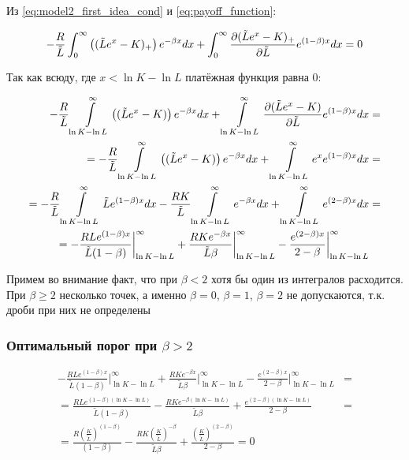 \documentclass[a4paper,12pt]{article}
\theoremstyle{definition}
\begin{document}
Из \eqref{eq:model2_first_idea_cond} и \eqref{eq:payoff_function}:

\begin{equation}\label{}
    - \frac{R}{\tilde{L}} \int_{0}^{\infty} \left((\tilde{L} e^{x} - K)_{+}\right) e^{-\beta x} dx + \int_{0}^{\infty} \pdv{(\tilde{L} e^{x} - K)_{+}}{\tilde{L}} e^{(1 - \beta) x} dx = 0
\end{equation}

Так как всюду, где $x < \ln K - \ln L$ платёжная функция равна $0$:

\begin{equation}
\begin{split}
    - \frac{R}{\tilde{L}} \int\limits_{\ln K - \ln L}^{\infty} \left((\tilde{L} e^{x} - K)\right) e^{-\beta x} dx + \int\limits_{\ln K - \ln L}^{\infty} \pdv{(\tilde{L} e^{x} - K)} {\tilde{L}} e^{(1 - \beta) x} dx &= \\
    = - \frac{R}{\tilde{L}} \int\limits_{\ln K - \ln L}^{\infty} \left((\tilde{L} e^{x} - K)\right) e^{-\beta x} dx + \int\limits_{\ln K - \ln L}^{\infty} e^{x} e^{(1 - \beta) x} dx &= \\
    = - \frac{R}{\tilde{L}} \int\limits_{\ln K - \ln L}^{\infty} \tilde{L} e^{(1 - \beta) x} dx - \frac{R K}{\tilde{L}} \int\limits_{\ln K - \ln L}^{\infty} e^{-\beta x} dx + \int\limits_{\ln K - \ln L}^{\infty} e^{(2 - \beta) x} dx &= \\
    = - \frac{R L e^{(1 - \beta) x}}{\tilde{L} (1 - \beta)}\bigg|_{\ln K - \ln L}^{\infty} + \frac{R K e^{-\beta x}}{\tilde{L} \beta}\bigg|_{\ln K - \ln L}^{\infty} - \frac{e^{(2 - \beta) x}}{2 - \beta}\bigg|_{\ln K - \ln L}^{\infty}
\end{split}
\end{equation}

Примем во внимание факт, что при $\beta < 2$ хотя бы один из интегралов расходится. При $\beta \ge 2$ несколько точек, а именно $\beta = 0$, $\beta = 1$, $\beta = 2$ не допускаются, т.к. дроби при них не определены

\subsubsection{Оптимальный порог при $\beta > 2$}

\begin{equation*}
\begin{split}
    - \frac{R L e^{(1 - \beta) x}}{\tilde{L} (1 - \beta)}\bigg|_{\ln K - \ln L}^{\infty} + \frac{R K e^{-\beta x}}{\tilde{L} \beta}\bigg|_{\ln K - \ln L}^{\infty} - \frac{e^{(2 - \beta) x}}{2 - \beta}\bigg|_{\ln K - \ln L}^{\infty} &= \\
    = \frac{R L e^{(1 - \beta) (\ln K - \ln L)}}{\tilde{L} (1 - \beta)} - \frac{R K e^{-\beta (\ln K - \ln L)}}{\tilde{L} \beta} + \frac{e^{(2 - \beta) (\ln K - \ln L)}}{2 - \beta} &= \\
    = \frac{R \left(\frac{K}{\tilde{L}}\right)^{(1 - \beta)}}{(1 - \beta)} - \frac{R K \left(\frac{K}{\tilde{L}}\right)^{-\beta}}{\tilde{L} \beta} + \frac{\left(\frac{K}{\tilde{L}}\right)^{(2 - \beta)}}{2 - \beta} = 0
\end{split}
\end{equation*}
\end{document}

